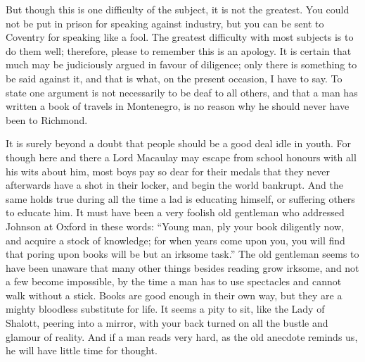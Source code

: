 But though this is one difficulty of the subject, it is not the
greatest. You could not be put in prison for speaking against
industry, but you can be sent to Coventry for speaking like a fool.
The greatest difficulty with most subjects is to do them well;
therefore, please to remember this is an apology. It is certain that
much may be judiciously argued in favour of diligence; only there is
something to be said against it, and that is what, on the present
occasion, I have to say. To state one argument is not necessarily to
be deaf to all others, and that a man has written a book of travels in
Montenegro, is no reason why he should never have been to Richmond.

It is surely beyond a doubt that people should be a good deal idle in
youth. For though here and there a Lord Macaulay may  escape
from school honours with all his wits about him, most boys pay so dear
for their medals that they never afterwards have a shot in their
locker, and begin the world bankrupt. And the same holds true during
all the time a lad is educating himself, or suffering others to
educate him. It must have been a very foolish old gentleman who
addressed Johnson at Oxford in these words: ``Young man, ply your book
diligently now, and acquire a stock of knowledge; for when years come
upon you, you will find that poring upon books will be but an irksome
task.'' The old gentleman seems to have been unaware that many other
things besides reading grow irksome, and not a few become impossible,
by the time a man has to use spectacles and cannot walk without a
stick. Books are good enough in their own way, but they are a mighty
bloodless substitute for life. It seems a pity to sit, like the Lady
of Shalott, peering into a mirror, with your back turned on all the
bustle and glamour of reality. And if a man reads very hard, as
 the old anecdote reminds us, he will have little time for
thought.

